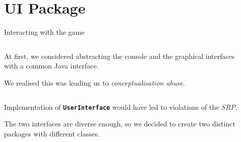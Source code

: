 \documentclass{beamer}
\begin{document}
\section{UI Package}


  \begin{frame}{Interacting with the game}


    \begin{minipage}{\textwidth}
    \begin{columns}[t]
      \begin{column}{0.45\textwidth}

        \justifying
        At first, we considered abstracting the console and the graphical interfaces with a common Java interface.

        \vspace{1em}
        
        We realised this was leading us to \textit{conceptualisation abuse}. 

      \end{column}
      \begin{column}{0.45\textwidth}


      \end{column}
    \end{columns}
    \end{minipage}

    \vspace{2em}

    Implementation of \texttt{\textbf{UserInterface}} would have led to violations of the \textit{SRP}.

    \vspace{1em}

    The two interfaces are diverse enough, so we decided to create two distinct packages with different classes.
  \end{frame}
  
\end{document}
